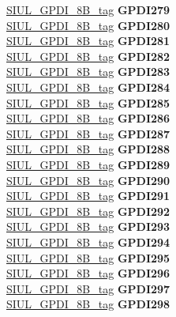 \begin{DoxyCompactItemize}
\begin{tabbing}
\>\>\mbox{\hyperlink{unionSIUL__GPDI__8B__tag}{SIUL\_GPDI\_8B\_tag}} {\bfseries GPDI279}\\
\>\>\mbox{\hyperlink{unionSIUL__GPDI__8B__tag}{SIUL\_GPDI\_8B\_tag}} {\bfseries GPDI280}\\
\>\>\mbox{\hyperlink{unionSIUL__GPDI__8B__tag}{SIUL\_GPDI\_8B\_tag}} {\bfseries GPDI281}\\
\>\>\mbox{\hyperlink{unionSIUL__GPDI__8B__tag}{SIUL\_GPDI\_8B\_tag}} {\bfseries GPDI282}\\
\>\>\mbox{\hyperlink{unionSIUL__GPDI__8B__tag}{SIUL\_GPDI\_8B\_tag}} {\bfseries GPDI283}\\
\>\>\mbox{\hyperlink{unionSIUL__GPDI__8B__tag}{SIUL\_GPDI\_8B\_tag}} {\bfseries GPDI284}\\
\>\>\mbox{\hyperlink{unionSIUL__GPDI__8B__tag}{SIUL\_GPDI\_8B\_tag}} {\bfseries GPDI285}\\
\>\>\mbox{\hyperlink{unionSIUL__GPDI__8B__tag}{SIUL\_GPDI\_8B\_tag}} {\bfseries GPDI286}\\
\>\>\mbox{\hyperlink{unionSIUL__GPDI__8B__tag}{SIUL\_GPDI\_8B\_tag}} {\bfseries GPDI287}\\
\>\>\mbox{\hyperlink{unionSIUL__GPDI__8B__tag}{SIUL\_GPDI\_8B\_tag}} {\bfseries GPDI288}\\
\>\>\mbox{\hyperlink{unionSIUL__GPDI__8B__tag}{SIUL\_GPDI\_8B\_tag}} {\bfseries GPDI289}\\
\>\>\mbox{\hyperlink{unionSIUL__GPDI__8B__tag}{SIUL\_GPDI\_8B\_tag}} {\bfseries GPDI290}\\
\>\>\mbox{\hyperlink{unionSIUL__GPDI__8B__tag}{SIUL\_GPDI\_8B\_tag}} {\bfseries GPDI291}\\
\>\>\mbox{\hyperlink{unionSIUL__GPDI__8B__tag}{SIUL\_GPDI\_8B\_tag}} {\bfseries GPDI292}\\
\>\>\mbox{\hyperlink{unionSIUL__GPDI__8B__tag}{SIUL\_GPDI\_8B\_tag}} {\bfseries GPDI293}\\
\>\>\mbox{\hyperlink{unionSIUL__GPDI__8B__tag}{SIUL\_GPDI\_8B\_tag}} {\bfseries GPDI294}\\
\>\>\mbox{\hyperlink{unionSIUL__GPDI__8B__tag}{SIUL\_GPDI\_8B\_tag}} {\bfseries GPDI295}\\
\>\>\mbox{\hyperlink{unionSIUL__GPDI__8B__tag}{SIUL\_GPDI\_8B\_tag}} {\bfseries GPDI296}\\
\>\>\mbox{\hyperlink{unionSIUL__GPDI__8B__tag}{SIUL\_GPDI\_8B\_tag}} {\bfseries GPDI297}\\
\>\>\mbox{\hyperlink{unionSIUL__GPDI__8B__tag}{SIUL\_GPDI\_8B\_tag}} {\bfseries GPDI298}\\

\end{tabbing}
\end{DoxyCompactItemize}
